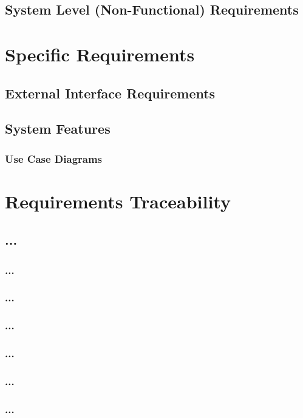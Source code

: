 \documentclass[12pt, oneside, letterpaper]{report}
\begin{document}
	\section{System Level (Non-Functional) Requirements}
		
\chapter{Specific Requirements}
	\section{External Interface Requirements}
		
	\section{System Features}
		\subsection{Use Case Diagrams}
		
		




\chapter{Requirements Traceability}
		\section{...}
			\subsection{...}
			\subsection{...}
			\subsection{...}
			\subsection{...}
			\subsection{...}
			\subsection{...}
\end{document}
